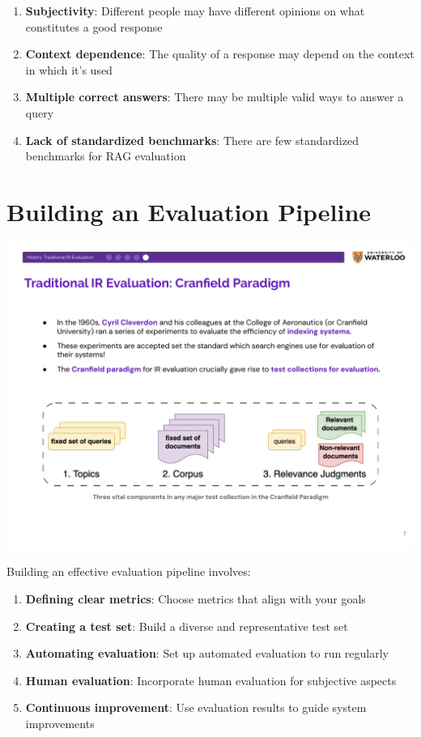 \documentclass[
  letterpaper,
  oneside]{scrbook}
\providecommand{\tightlist}{%
  \setlength{\itemsep}{0pt}\setlength{\parskip}{0pt}}\usepackage{longtable,booktabs,array}
\begin{document}
\begin{enumerate}
\def\labelenumi{\arabic{enumi}.}
\tightlist
\item
  \textbf{Subjectivity}: Different people may have different opinions on
  what constitutes a good response
\item
  \textbf{Context dependence}: The quality of a response may depend on
  the context in which it's used
\item
  \textbf{Multiple correct answers}: There may be multiple valid ways to
  answer a query
\item
  \textbf{Lack of standardized benchmarks}: There are few standardized
  benchmarks for RAG evaluation
\end{enumerate}

\section{Building an Evaluation
Pipeline}\label{building-an-evaluation-pipeline}

\includegraphics{chapters/../p2-images/slide_7.png}

Building an effective evaluation pipeline involves:

\begin{enumerate}
\def\labelenumi{\arabic{enumi}.}
\tightlist
\item
  \textbf{Defining clear metrics}: Choose metrics that align with your
  goals
\item
  \textbf{Creating a test set}: Build a diverse and representative test
  set
\item
  \textbf{Automating evaluation}: Set up automated evaluation to run
  regularly
\item
  \textbf{Human evaluation}: Incorporate human evaluation for subjective
  aspects
\item
  \textbf{Continuous improvement}: Use evaluation results to guide
  system improvements
\end{enumerate}
\end{document}
